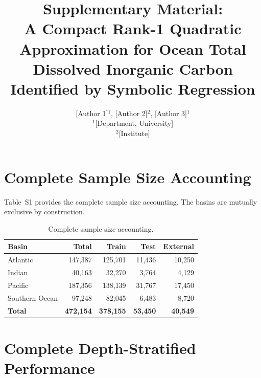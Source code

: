 \documentclass[12pt,a4paper]{article}
\title{Supplementary Material:\\A Compact Rank-1 Quadratic Approximation for Ocean Total Dissolved Inorganic Carbon Identified by Symbolic Regression}
\author{[Author 1]$^{1}$, [Author 2]$^{2}$, [Author 3]$^{1}$\\
\small $^{1}$[Department, University]\\
\small $^{2}$[Institute]
}
\date{}
\begin{document}
\maketitle

\setcounter{section}{0}
\renewcommand{\thesection}{S\arabic{section}}

\section{Complete Sample Size Accounting}

Table~S1 provides the complete sample size accounting. The basins are mutually exclusive by construction.

\begin{table}[htbp]
\centering
\caption{Complete sample size accounting.}
\begin{tabular}{lrrrr}
\toprule
\textbf{Basin} & \textbf{Total} & \textbf{Train} & \textbf{Test} & \textbf{External} \\
\midrule
Atlantic        & 147{,}387 & 125{,}701 & 11{,}436 & 10{,}250 \\
Indian          &  40{,}163 &  32{,}270 &  3{,}764 &  4{,}129 \\
Pacific         & 187{,}356 & 138{,}139 & 31{,}767 & 17{,}450 \\
Southern Ocean  &  97{,}248 &  82{,}045 &  6{,}483 &  8{,}720 \\
\midrule
\textbf{Total}  & \textbf{472{,}154} & \textbf{378{,}155} & \textbf{53{,}450} & \textbf{40{,}549} \\
\bottomrule
\end{tabular}
\end{table}

\section{Complete Depth-Stratified Performance}
\end{document}

